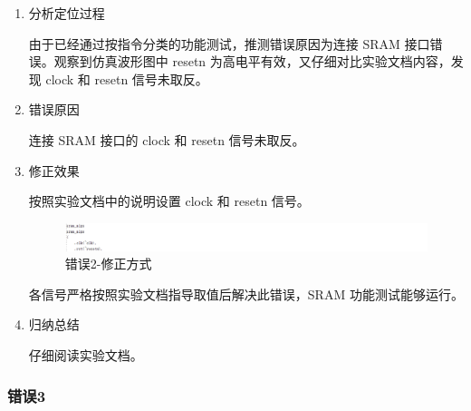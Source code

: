 \begin{enumerate}[(1)]
    \item 分析定位过程

由于已经通过按指令分类的功能测试，推测错误原因为连接 SRAM 接口错误。观察到仿真波形图中 resetn 为高电平有效，又仔细对比实验文档内容，发现 clock 和 resetn 信号未取反。

    \item 错误原因

连接 SRAM 接口的 clock 和 resetn 信号未取反。
    
    \item 修正效果

按照实验文档中的说明设置 clock 和 resetn 信号。

\begin{figure}[H]
    \centering
    \includegraphics[width=\textwidth]{image/错误2-修正效果1.png}
    \caption{错误2-修正方式}
    \label{fig:错误2-修正效果1}
\end{figure}

各信号严格按照实验文档指导取值后解决此错误，SRAM 功能测试能够运行。
    
    \item 归纳总结

    仔细阅读实验文档。
    
\end{enumerate}

\subsubsection{错误3}


